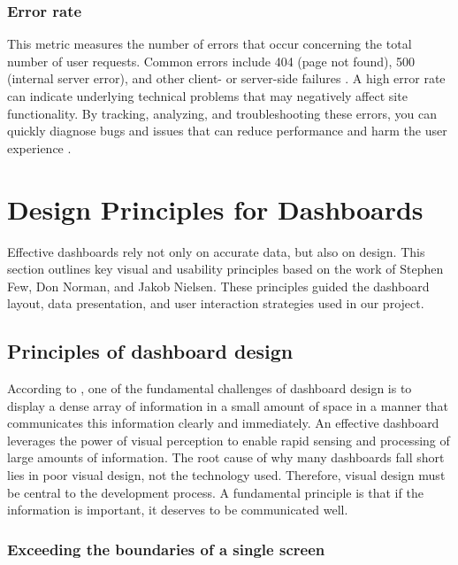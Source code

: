 \subsubsection{Error rate}
\label{subsubsec:error_rate}


This metric measures the number of errors that occur concerning the total number of user requests. Common errors include 404 (page not found), 500 (internal server error), and other client- or server-side failures \autocite{IBMwebmonitor}. A high error rate can indicate underlying technical problems that may negatively affect site functionality. By tracking, analyzing, and troubleshooting these errors, you can quickly diagnose bugs and issues that can reduce performance and harm the user experience \autocite{akamai}.

\section{Design Principles for Dashboards}
\label{sec:design_principles}

Effective dashboards rely not only on accurate data, but also on design. This section outlines key visual and usability principles based on the work of Stephen Few, Don Norman, and Jakob Nielsen. These principles guided the dashboard layout, data presentation, and user interaction strategies used in our project. 

\subsection{Principles of dashboard design}
\label{subsec:principles_of_dashboard_design}


According to \textcite{FewDashboard}, one of the fundamental challenges of dashboard design is to display a dense array of information in a small amount of space in a manner that communicates this information clearly and immediately. An effective dashboard leverages the power of visual perception to enable rapid sensing and processing of large amounts of information. The root cause of why many dashboards fall short lies in poor visual design, not the technology used. Therefore, visual design must be central to the development process. A fundamental principle is that if the information is important, it deserves to be communicated well.


\subsubsection{Exceeding the boundaries of a single screen}
\label{subsubsec:single_screen_boundaries}


